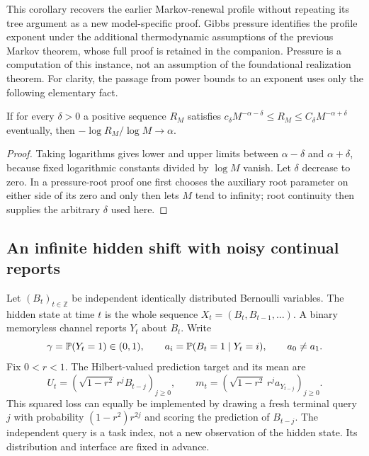 This corollary recovers the earlier Markov-renewal profile without
repeating its tree argument as a new model-specific proof. Gibbs
pressure identifies the profile exponent under the additional
thermodynamic assumptions of the previous Markov theorem, whose full
proof is retained in the companion. Pressure is a computation of this
instance, not an assumption of the foundational realization theorem.
For clarity, the passage from power bounds to an exponent uses only the
following elementary fact.

\begin{proposition}\label{prop:v7-exponent-squeeze}
If for every $\delta>0$ a positive sequence $R_M$ satisfies
$c_\delta M^{-\alpha-\delta}\le R_M\le
C_\delta M^{-\alpha+\delta}$ eventually, then
$-\log R_M/\log M\to\alpha$.
\end{proposition}
\begin{proof}
Taking logarithms gives lower and upper limits between
$\alpha-\delta$ and $\alpha+\delta$, because fixed logarithmic constants
divided by $\log M$ vanish. Let $\delta$ decrease to zero. In a
pressure-root proof one first chooses the auxiliary root parameter on
either side of its zero and only then lets $M$ tend to infinity; root
continuity then supplies the arbitrary $\delta$ used here.
\end{proof}

\subsection{An infinite hidden shift with noisy continual reports}
Let $(B_t)_{t\in\mathbb Z}$ be independent identically distributed Bernoulli variables. The hidden
state at time $t$ is the whole sequence
$X_t=(B_t,B_{t-1},\ldots)$. A binary memoryless channel reports $Y_t$
about $B_t$. Write
\[
 \gamma=\mathbb P(Y_t=1)\in(0,1),\qquad
 a_i=\mathbb P(B_t=1\mid Y_t=i),\qquad a_0\ne a_1.
\]
Fix $0<r<1$. The Hilbert-valued prediction target and its mean are
\begin{equation}
 U_t=(\sqrt{1-r^2}\,r^j B_{t-j})_{j\ge0},\qquad
 m_t=(\sqrt{1-r^2}\,r^j a_{Y_{t-j}})_{j\ge0}.           \label{eq:v7-shift-target}
\end{equation}
This squared loss can equally be implemented by drawing a fresh terminal
query $j$ with probability $(1-r^2)r^{2j}$ and scoring the prediction
of $B_{t-j}$. The independent query is a task index, not a new
observation of the hidden state. Its distribution and interface are
fixed in advance.

